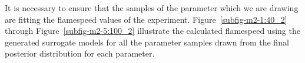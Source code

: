 

 It is necessary to ensure that the samples of the parameter which we
 are drawing are fitting the flamespeed values of the
 experiment. Figure~\ref{subfig-m2-1:40_2} through
 Figure~\ref{subfig-m2-5:100_2} illustrate the calculated flamespeed
 using the generated surrogate models for all the
 parameter samples drawn from the final posterior distribution for
 each parameter.











